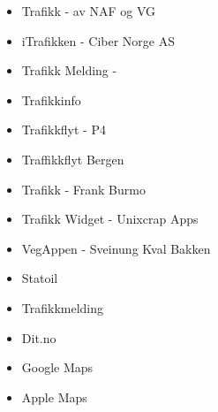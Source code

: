 \begin{itemize}
\item Trafikk - av NAF og VG

\item iTrafikken - Ciber Norge AS

\item Trafikk Melding -

\item Trafikkinfo

\item Trafikkflyt - P4

\item Traffikkflyt Bergen

\item Trafikk - Frank Burmo

\item Trafikk Widget - Unixcrap Apps

\item VegAppen - Sveinung Kval Bakken

\item Statoil

\item Trafikkmelding

\item Dit.no

\item Google Maps

\item Apple Maps

\end{itemize}
